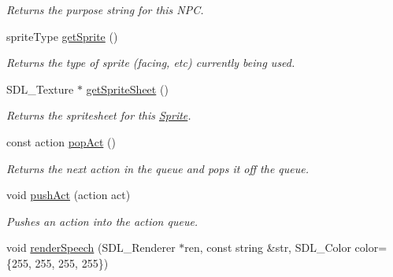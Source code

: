 \begin{DoxyCompactItemize}
\begin{DoxyCompactList}\small\item\em Returns the purpose string for this N\+PC. \end{DoxyCompactList}\item 
sprite\+Type \hyperlink{class_sprite_a01742e39c9f18622a094a187d6858912}{get\+Sprite} ()\hypertarget{class_sprite_a01742e39c9f18622a094a187d6858912}{}\label{class_sprite_a01742e39c9f18622a094a187d6858912}

\begin{DoxyCompactList}\small\item\em Returns the type of sprite (facing, etc) currently being used. \end{DoxyCompactList}\item 
S\+D\+L\+\_\+\+Texture $\ast$ \hyperlink{class_sprite_abec247d2cd9396834344c3cfe81eddc1}{get\+Sprite\+Sheet} ()\hypertarget{class_sprite_abec247d2cd9396834344c3cfe81eddc1}{}\label{class_sprite_abec247d2cd9396834344c3cfe81eddc1}

\begin{DoxyCompactList}\small\item\em Returns the spritesheet for this \hyperlink{class_sprite}{Sprite}. \end{DoxyCompactList}\item 
const action \hyperlink{class_sprite_a1b5ac18ba8c0a4e4245d1ed49b9a48aa}{pop\+Act} ()\hypertarget{class_sprite_a1b5ac18ba8c0a4e4245d1ed49b9a48aa}{}\label{class_sprite_a1b5ac18ba8c0a4e4245d1ed49b9a48aa}

\begin{DoxyCompactList}\small\item\em Returns the next action in the queue and pops it off the queue. \end{DoxyCompactList}\item 
void \hyperlink{class_sprite_a25d3b1c4533e8aa9e530d7025dc5365b}{push\+Act} (action act)\hypertarget{class_sprite_a25d3b1c4533e8aa9e530d7025dc5365b}{}\label{class_sprite_a25d3b1c4533e8aa9e530d7025dc5365b}

\begin{DoxyCompactList}\small\item\em Pushes an action into the action queue. \end{DoxyCompactList}\item 
void \hyperlink{class_sprite_a602e995adde51d155e2d0e83285f0643}{render\+Speech} (S\+D\+L\+\_\+\+Renderer $\ast$ren, const string \&str, S\+D\+L\+\_\+\+Color color=\{255, 255, 255, 255\})\hypertarget{class_sprite_a602e995adde51d155e2d0e83285f0643}{}\label{class_sprite_a602e995adde51d155e2d0e83285f0643}


\end{DoxyCompactItemize}
